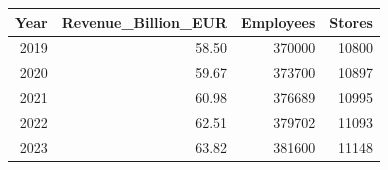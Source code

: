 \begin{tabular}{rrrr}
\toprule
Year & Revenue_Billion_EUR & Employees & Stores \\
\midrule
2019 & 58.50 & 370000 & 10800 \\
2020 & 59.67 & 373700 & 10897 \\
2021 & 60.98 & 376689 & 10995 \\
2022 & 62.51 & 379702 & 11093 \\
2023 & 63.82 & 381600 & 11148 \\
\bottomrule
\end{tabular}
